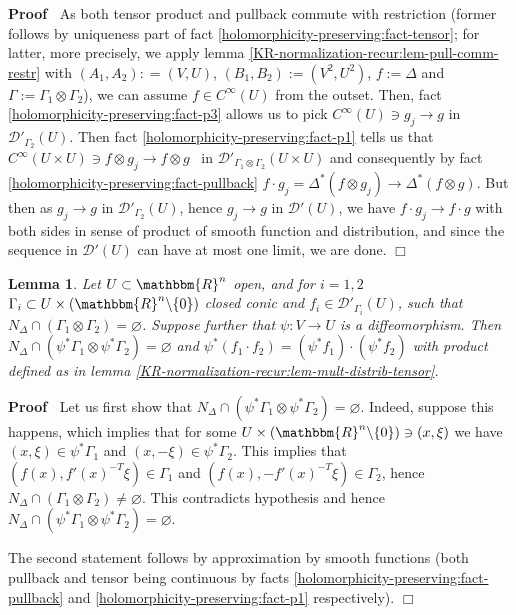 \documentclass{article}
\newcommand{\assign}{:=}
\newenvironment{proof}{\noindent\textbf{Proof\ }}{\hspace*{\fill}$\Box$\medskip}
\numberwithin{definition}{section}
\newtheorem{lemma}{Lemma}
\numberwithin{lemma}{section}
\numberwithin{proposition}{section}
{\theorembodyfont{\rmfamily}\newtheorem{remark}{Remark}
\numberwithin{remark}{section}
}
\begin{document}
\begin{proof}
  As both tensor product and pullback commute with restriction (former follows
  by uniqueness part of fact \ref{holomorphicity-preserving:fact-tensor}; for
  latter, more precisely, we apply lemma
  \ref{KR-normalization-recur:lem-pull-comm-restr} with $( A_1, A_2) : = ( V,
  U)$, $( B_1, B_2) \assign ( V^2, U^2)$, $f \assign \Delta$ and $\Gamma
  \assign \Gamma_1 \otimes \Gamma_2$), we can assume $f \in C^{\infty} ( U)$
  from the outset. Then, fact \ref{holomorphicity-preserving:fact-p3} allows
  us to pick $C^{\infty} ( U) \ni g_j \rightarrow g$ in
  $\mathcal{D}'_{\Gamma_2} ( U)$. Then fact
  \ref{holomorphicity-preserving:fact-p1} tells us that $C^{\infty} ( U \times
  U) \ni f \otimes g_j \rightarrow f \otimes g$ \ in $\mathcal{D}'_{\Gamma_1
  \otimes \Gamma_2} ( U \times U)$ and consequently by fact
  \ref{holomorphicity-preserving:fact-pullback} $f \cdot g_j = \Delta^{\ast} (
  f \otimes g_j) \rightarrow \Delta^{\ast} ( f \otimes g)$. But then as $g_j
  \rightarrow g$ in $\mathcal{D}'_{\Gamma_2} ( U)$, hence $g_j \rightarrow g$
  in $\mathcal{D}' ( U)$, we have $f \cdot g_j \rightarrow f \cdot g$ with
  both sides in sense of product of smooth function and distribution, and
  since the sequence in $\mathcal{D}' ( U)$ can have at most one limit, we are
  done.
\end{proof}

\begin{lemma}
  \label{KR-normalization-recur:lem-mult-comm-pull}Let $U \subset
  \mathbbm{R}^n$ open, and for $i = 1, 2$ $\Gamma_i \subset U \times (
  \mathbbm{R}^n \backslash \{ 0 \})$ closed conic and $f_i \in
  \mathcal{D}'_{\Gamma_i} ( U)$, such that $N_{\Delta} \cap ( \Gamma_1 \otimes
  \Gamma_2) = \varnothing$. Suppose further that $\psi : V \rightarrow U$ is a
  diffeomorphism. Then $N_{\Delta} \cap ( \psi^{\ast} \Gamma_1 \otimes
  \psi^{\ast} \Gamma_2) = \varnothing$ and $\psi^{\ast} ( f_1 \cdot f_2) = (
  \psi^{\ast} f_1) \cdot ( \psi^{\ast} f_2)$ with product defined as in lemma
  \ref{KR-normalization-recur:lem-mult-distrib-tensor}.
\end{lemma}

\begin{proof}
  Let us first show that $N_{\Delta} \cap ( \psi^{\ast} \Gamma_1 \otimes
  \psi^{\ast} \Gamma_2) = \varnothing$. Indeed, suppose this happens, which
  implies that for some $U \times ( \mathbbm{R}^n \backslash \{ 0 \}) \ni ( x,
  \xi)$ we have $( x, \xi) \in \psi^{\ast} \Gamma_1$ and $( x, - \xi) \in
  \psi^{\ast} \Gamma_2$. This implies that $( f ( x), f' ( x)^{- T} \xi) \in
  \Gamma_1$ and $( f ( x), - f' ( x)^{- T} \xi) \in \Gamma_2$, hence
  $N_{\Delta} \cap ( \Gamma_1 \otimes \Gamma_2) \neq \varnothing$. This
  contradicts hypothesis and hence $N_{\Delta} \cap ( \psi^{\ast} \Gamma_1
  \otimes \psi^{\ast} \Gamma_2) = \varnothing$.
  
  The second statement follows by approximation by smooth functions (both
  pullback and tensor being continuous by facts
  \ref{holomorphicity-preserving:fact-pullback} and
  \ref{holomorphicity-preserving:fact-p1} respectively).
\end{proof}
\end{document}
